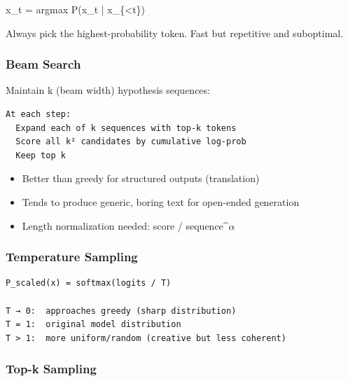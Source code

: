\documentclass[11pt]{article}
\providecommand{\tightlist}{\setlength{\itemsep}{1pt}\setlength{\parskip}{0pt}}
\newenvironment{Shaded}{\begin{snugshade}}{\end{snugshade}}
\newcommand{\NormalTok}[1]{\textcolor[rgb]{0.81,0.81,0.76}{#1}}
\newcommand{\OperatorTok}[1]{\textcolor[rgb]{0.81,0.81,0.76}{#1}}
\begin{document}

\begin{Shaded}
\begin{Highlighting}[]
\NormalTok{x\_t }\OperatorTok{=}\NormalTok{ argmax P(x\_t }\OperatorTok{|}\NormalTok{ x\_\{}\OperatorTok{\textless{}}\NormalTok{t\})}
\end{Highlighting}
\end{Shaded}

Always pick the highest-probability token. Fast but repetitive and suboptimal.

\subsubsection{Beam Search}\label{beam-search}

Maintain k (beam width) hypothesis sequences:

\setcodelang{}

\begin{verbatim}
At each step:
  Expand each of k sequences with top-k tokens
  Score all k² candidates by cumulative log-prob
  Keep top k
\end{verbatim}

\begin{itemize}
\tightlist
\item
  Better than greedy for structured outputs (translation)
\item
  Tends to produce generic, boring text for open-ended generation
\item
  Length normalization needed: score / \textbar sequence\textbar\^{}\(\alpha\)
\end{itemize}

\subsubsection{Temperature Sampling}\label{temperature-sampling}

\setcodelang{}

\begin{verbatim}
P_scaled(x) = softmax(logits / T)

T → 0:  approaches greedy (sharp distribution)
T = 1:  original model distribution
T > 1:  more uniform/random (creative but less coherent)
\end{verbatim}

\subsubsection{Top-k Sampling}\label{top-k-sampling}
\end{document}
